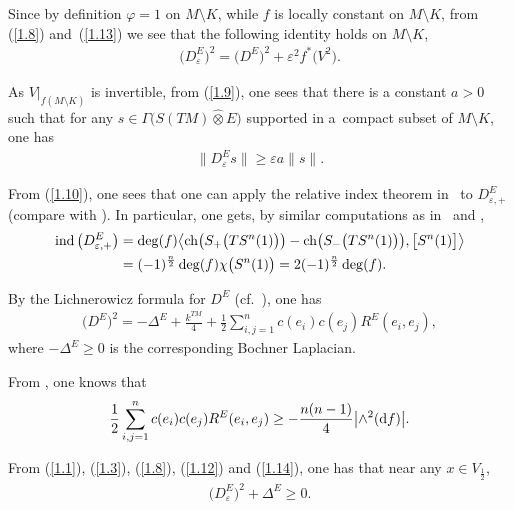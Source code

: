 Since by definition $\varphi=1$ on $M\setminus K$, while $f$ is locally constant on $M\setminus K $, from (\ref{1.8}) and~(\ref{1.13}) we see that the following identity holds on $M\setminus K$,
\begin{gather}\label{1.9}
\big(D^E_\varepsilon\big)^2 =\big(D^E\big)^2 +\varepsilon^2 f^*\big(V ^2\big).
\end{gather}

As $V|_{ {f(M\setminus K)}}$ is invertible, from (\ref{1.9}), one sees that there is a constant $a>0$ such that for any $s\in \Gamma\big(S(TM)\widehat\otimes E\big)$ supported in a~compact subset of $M\setminus K$, one has
\begin{gather}\label{1.10}
\big\|D^E_\varepsilon s\big\| \geq \varepsilon a \|s\|.
\end{gather}

 From (\ref{1.10}), one sees that one can apply the relative index theorem in~\cite{GL83} to $D^E_{\varepsilon,+}$ (compare with \cite[Section~6$\frac{4}{5}$]{Gr96}). In particular, one gets, by similar computations as in~\cite{GL83} and \cite[Proposition~III.11.24]{LaMi89},
\begin{align}
\operatorname{ind}\big(D^E_{\varepsilon,+}\big)
&= \deg (f)\big\langle {\rm ch}\big(S_+\big(TS^n(1)\big)\big) -
 {\rm ch}\big(S_-\big(TS^n(1)\big)\big),\big[S^n(1)\big]\big\rangle
\nonumber\\
& =(-1)^{\frac{n}{2}}\deg (f) \chi\big(S^n(1)\big)
 =2(-1)^{\frac{n}{2}}\deg (f) .\label{1.11}
\end{align}

 By the Lichnerowicz formula \cite{L63} for $D^E$ (cf.~\cite{LaMi89}), one has
\begin{gather}\label{1.12}
\big(D^E\big)^2=-\Delta^E+\frac{k^{TM}}{4}+\frac{1}{2}\sum_{i, j=1}^n c (e_i )c (e_j )R^E (e_i,e_j ) ,
\end{gather}
where $-\Delta^E\geq 0$ is the corresponding Bochner Laplacian.

From \cite[equation~(4.6)]{L98}, one knows that
\begin{gather}\label{1.14}
\frac{1}{2}\sum_{i, j=1}^n c (e_i )c (e_j )R^E (e_i,e_j )\geq -\frac{n(n-1)}{4}\big|{\wedge}^2({\rm d}f)\big|.
\end{gather}

From (\ref{1.1}), (\ref{1.3}), (\ref{1.8}), (\ref{1.12}) and (\ref{1.14}), one has that near any $x\in V_{\frac{1}{2}}$,
\begin{gather}\label{1.15}
\big(D_\varepsilon^E\big)^2+\Delta^E \geq0.
\end{gather}

